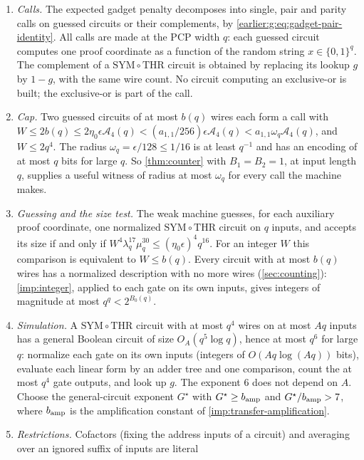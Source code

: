 \documentclass[11pt,letterpaper]{article}
\theoremstyle{definition}
\theoremstyle{remark}
\newcommand{\THR}{\mathrm{THR}}
\newcommand{\SYM}{\mathrm{SYM}}
\begin{document}
\begin{enumerate}[label=(S\arabic*)]
\item \emph{Calls.} The expected gadget penalty decomposes into
single, pair and parity calls on guessed circuits or their
complements, by \eqref{earlier:g:eq:gadget-pair-identity}. All calls are made at the
PCP width \(q\): each guessed circuit computes one proof coordinate as
a function of the random string \(x\in\{0,1\}^q\). The complement of a
\(\SYM\circ\THR\) circuit is obtained by replacing its lookup \(g\) by
\(1-g\), with the same wire count. No circuit computing an
exclusive-or is built; the exclusive-or is part of the call.
\item \emph{Cap.} Two guessed circuits of at most \(b(q)\) wires each
form a call with
\(W\le2b(q)\le2\eta_0\epsilon\mathcal A_4(q)<(a_{1,1}/256)\epsilon\mathcal A_4(q)
<a_{1,1}\omega_q\mathcal A_4(q)\), and \(W\le2q^4\). The radius
\(\omega_q=\epsilon/128\le1/16\) is at least \(q^{-1}\) and has an
encoding of at most \(q\) bits for large \(q\). So \cref{thm:counter}
with \(B_1=B_2=1\), at input length \(q\), supplies a useful witness of
radius at most \(\omega_q\) for every call the machine makes.
\item \emph{Guessing and the size test.} The weak machine guesses, for
each auxiliary proof coordinate, one normalized \(\SYM\circ\THR\)
circuit on \(q\) inputs, and accepts its size if and only if
\(W^4\lambda_q^{17}\mu_q^{30}\le(\eta_0\epsilon)^4q^{16}\). For an
integer \(W\) this comparison is equivalent to \(W\le b(q)\). Every
circuit with at most \(b(q)\) wires has a normalized description with
no more wires (\cref{sec:counting}): \cref{imp:integer}, applied to each
gate on its own inputs, gives integers of magnitude at most
\(q^q<2^{B_0(q)}\).
\item \emph{Simulation.} A \(\SYM\circ\THR\) circuit with at most
\(q^4\) wires on at most \(Aq\) inputs has a general Boolean circuit of
size \(O_A(q^5\log q)\), hence at most \(q^6\) for large \(q\):
normalize each gate on its own inputs (integers of \(O(Aq\log(Aq))\)
bits), evaluate each linear form by an adder tree and one comparison,
count the at most \(q^4\) gate outputs, and look up \(g\). The exponent
\(6\) does not depend on \(A\). Choose the general-circuit exponent
\(G^\star\) with
\(G^\star\ge b_{\rm amp}\) and \(G^\star/b_{\rm amp}>7\), where
\(b_{\rm amp}\) is the amplification constant
of \cref{imp:transfer-amplification}.
\item \emph{Restrictions.} Cofactors (fixing the address inputs of a
circuit) and averaging over an ignored suffix of inputs are literal

\end{enumerate}
\end{document}
